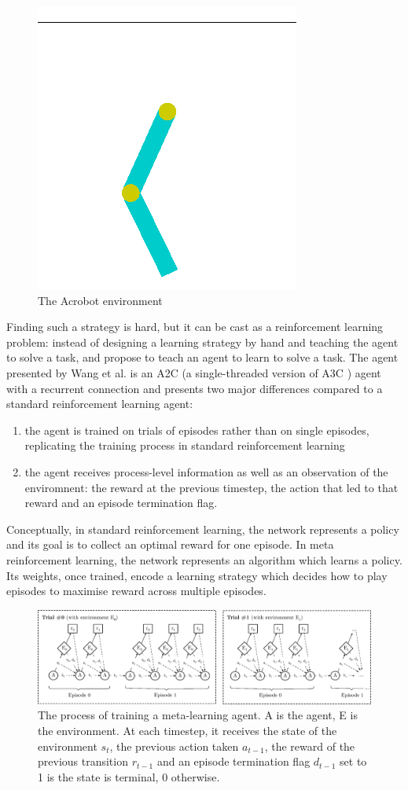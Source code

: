 \documentclass[letterpaper]{article}
\begin{document}
\begin{figure}[H]
	\centering
	\includegraphics[width=.4\linewidth]{fig/acrobot.png}
	\caption{The Acrobot environment}
	\label{fig:acrobot}
\end{figure}


Finding such a strategy is hard, but it can be cast as a reinforcement
learning problem: instead of designing a learning strategy by hand and
teaching the agent to solve a task, \cite{learningtorl}
and \cite{fastrlviaslowrl} propose to
teach an agent to learn to solve a task. The agent presented by Wang et al. is 
an A2C (a single-threaded version of A3C \citep{a3c})
agent with a recurrent connection and presents
two major differences compared to a standard reinforcement learning agent: 
\begin{enumerate}
	\item the agent is trained on trials of episodes rather than on single
		episodes, replicating the training process in standard 
		reinforcement learning
	\item the agent receives process-level information as well as
		an observation of the enviromnent: the reward at the previous
		timestep, the action that led to that reward and an 
		episode termination flag.
\end{enumerate}

Conceptually, in standard reinforcement learning, the network represents 
a policy and its goal is to collect an optimal reward for one episode. In
meta reinforcement learning, the network represents an algorithm which
learns a policy. Its weights, once trained, encode a learning strategy which
decides how to play episodes to maximise reward across multiple episodes.


\begin{figure}[h]
	\centering
	\includegraphics[width=\textwidth]{fig/meta_learning_process.eps}
	\caption{The process of training a meta-learning agent. 
	A is the agent, E is the environment. At each
	timestep, it receives the state of the environment $s_t$, 
	the previous action taken $a_{t-1}$, the reward of the previous
	transition $r_{t-1}$ and an episode termination flag $d_{t-1}$ set to 1 is the
	state is terminal, 0 otherwise.}
	\label{fig:meta_learning_process}
\end{figure}
\end{document}
